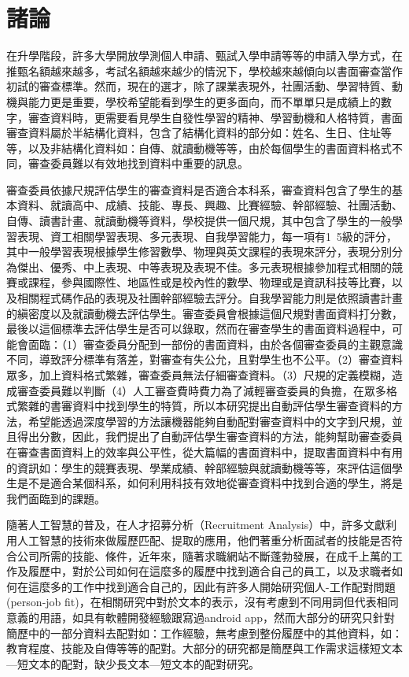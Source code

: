 
\chapter{諸論}

在升學階段，許多大學開放學測個人申請、甄試入學申請等等的申請入學方式，在推甄名額越來越多，考試名額越來越少的情況下，學校越來越傾向以書面審查當作初試的審查標準。然而，現在的選才，除了課業表現外，社團活動、學習特質、動機與能力更是重要，學校希望能看到學生的更多面向，而不單單只是成績上的數字，審查資料時，更需要看見學生自發性學習的精神、學習動機和人格特質，書面審查資料屬於半結構化資料，包含了結構化資料的部分如：姓名、生日、住址等等，以及非結構化資料如：自傳、就讀動機等等，由於每個學生的書面資料格式不同，審查委員難以有效地找到資料中重要的訊息。

審查委員依據尺規評估學生的審查資料是否適合本科系，審查資料包含了學生的基本資料、就讀高中、成績、技能、專長、興趣、比賽經驗、幹部經驗、社團活動、自傳、讀書計畫、就讀動機等資料，學校提供一個尺規，其中包含了學生的一般學習表現、資工相關學習表現、多元表現、自我學習能力，每一項有1~5級的評分，其中一般學習表現根據學生修習數學、物理與英文課程的表現來評分，表現分別分為傑出、優秀、中上表現、中等表現及表現不佳。多元表現根據參加程式相關的競賽或課程，參與國際性、地區性或是校內性的數學、物理或是資訊科技等比賽，以及相關程式碼作品的表現及社團幹部經驗去評分。自我學習能力則是依照讀書計畫的縝密度以及就讀動機去評估學生。審查委員會根據這個尺規對書面資料打分數，最後以這個標準去評估學生是否可以錄取，然而在審查學生的書面資料過程中，可能會面臨：（1）審查委員分配到一部份的書面資料，由於各個審查委員的主觀意識不同，導致評分標準有落差，對審查有失公允，且對學生也不公平。（2）審查資料眾多，加上資料格式繁雜，審查委員無法仔細審查資料。（3）尺規的定義模糊，造成審查委員難以判斷（4）人工審查費時費力為了減輕審查委員的負擔，在眾多格式繁雜的書審資料中找到學生的特質，所以本研究提出自動評估學生審查資料的方法，希望能透過深度學習的方法讓機器能夠自動配對審查資料中的文字到尺規，並且得出分數，因此，我們提出了自動評估學生審查資料的方法，能夠幫助審查委員在審查書面資料上的效率與公平性，從大篇幅的書面資料中，提取書面資料中有用的資訊如：學生的競賽表現、學業成績、幹部經驗與就讀動機等等，來評估這個學生是不是適合某個科系，如何利用科技有效地從審查資料中找到合適的學生，將是我們面臨到的課題。

隨著人工智慧的普及，在人才招募分析（Recruitment Analysis）中，許多文獻利用人工智慧的技術來做履歷匹配、提取的應用，他們著重分析面試者的技能是否符合公司所需的技能、條件，近年來，隨著求職網站不斷蓬勃發展，在成千上萬的工作及履歷中，對於公司如何在這麼多的履歷中找到適合自己的員工，以及求職者如何在這麼多的工作中找到適合自己的，因此有許多人開始研究個人-工作配對問題(person-job fit)，在相關研究中對於文本的表示，沒有考慮到不同用詞但代表相同意義的用語，如具有軟體開發經驗跟寫過android app，然而大部分的研究只針對簡歷中的一部分資料去配對如：工作經驗，無考慮到整份履歷中的其他資料，如：教育程度、技能及自傳等等的配對。大部分的研究都是簡歷與工作需求這樣短文本—短文本的配對，缺少長文本—短文本的配對研究。

